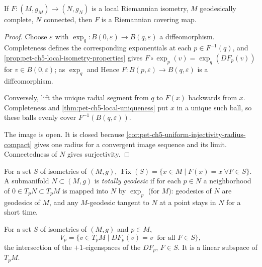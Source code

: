 \begin{lemma}
  \label{lem:pet-ch5-local-isometry-covering}

  If $F:(M,g_M)\to(N,g_N)$ is a local Riemannian isometry, $M$ geodesically
  complete, $N$ connected, then $F$ is a Riemannian covering map.
\end{lemma}
\begin{proof}
  \sketch
  Choose $\varepsilon$ with $\exp_q:B(0,\varepsilon)\to B(q,\varepsilon)$ a
  diffeomorphism. Completeness defines the corresponding exponentials at each
  $p\in F^{-1}(q)$, and \cref{prop:pet-ch5-local-isometry-properties} gives
  $F\circ\exp_p(v)=\exp_q(DF_p(v))$ for $v\in B(0,\varepsilon)$; as $\exp_q$ and
  Hence $F:B(p,\varepsilon)\to B(q,\varepsilon)$ is a diffeomorphism.

  Conversely, lift the unique radial segment from $q$ to $F(x)$ backwards from
  $x$. Completeness and \cref{thm:pet-ch5-local-uniqueness} put $x$ in a unique
  such ball, so these balls evenly cover $F^{-1}(B(q,\varepsilon))$.

  The image is open.  It is closed because
  \cref{cor:pet-ch5-uniform-injectivity-radius-compact} gives one radius for a
  convergent image sequence and its limit. Connectedness of $N$ gives surjectivity.
\end{proof}

\begin{definition}
  \label{def:pet-ch5-fixed-point-set}


  For a set $S$ of isometries of $(M,g)$, $\operatorname{Fix}(S)=\{x\in M\mid
  F(x)=x\ \forall F\in S\}$. A submanifold $N\subset(M,g)$ is \emph{totally
  geodesic} if for each $p\in N$ a neighborhood of $0\in T_pN\subset T_pM$ is
  mapped into $N$ by $\exp_p$ (for $M$): geodesics of $N$ are geodesics of $M$, and
  any $M$-geodesic tangent to $N$ at a point stays in $N$ for a short time.
\end{definition}

\begin{definition}
  \label{def:pet-ch5-fixed-tangent-subspace}


  For a set $S$ of isometries of $(M,g)$ and $p\in M$,
  \[
    V_p=\{v\in T_pM\mid DF_p(v)=v\ \text{ for all }F\in S\},
  \]
  the intersection of the $+1$-eigenspaces of the $DF_p$, $F\in S$. It is a linear
  subspace of $T_pM$.
\end{definition}

